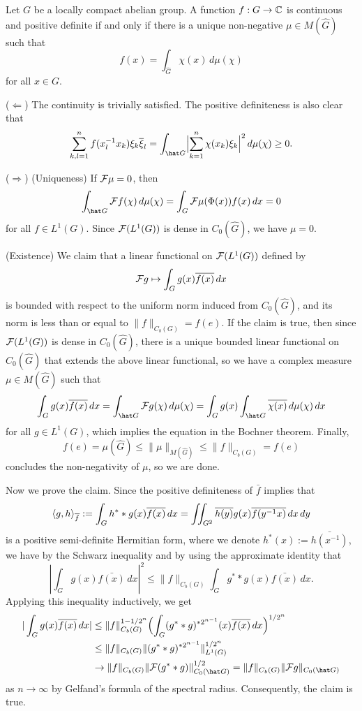 \documentclass[a4paper]{article}
\begin{document}
\begin{thm}
Let $G$ be a locally compact abelian group.
A function $f:G\to\mathbb{C}$ is continuous and positive definite if and only if there is a unique non-negative $\mu\in M(\hat G)$ such that 
\[f(x)=\int_{\hat G}\chi(x)\,d\mu(\chi)\]
for all $x\in G$.
\end{thm}
\begin{pf}
($\Leftarrow$)
The continuity is trivially satisfied.
The positive definiteness is also clear that
\[\sum_{k,l=1}^nf(x_l^{-1}x_k)\xi_k\bar\xi_l=\int_{\hat G}\Bigl|\sum_{k=1}^n\chi(x_k)\xi_k\Bigr|^2\,d\mu(\chi)\ge0.\]

($\Rightarrow$)
(Uniqueness)
If $\mathcal{F}\mu=0$, then
\[\int_{\hat G}\cF f(\chi)\,d\mu(\chi)=\int_G\cF\mu(\Phi(x))f(x)\,dx=0\]
for all $f\in L^1(G)$.
Since $\mathcal{F}(L^1(G))$ is dense in $C_0(\hat G)$, we have $\mu=0$.

(Existence)
We claim that a linear functional on $\mathcal{F}(L^1(G))$ defined by
\[\mathcal{F} g\mapsto\int_Gg(x)\overline{f(x)}\,dx\]
is bounded with respect to the uniform norm induced from $C_0(\hat G)$, and its norm is less than or equal to $\|f\|_{C_b(G)}=f(e)$.
If the claim is true, then since $\mathcal{F}(L^1(G))$ is dense in $C_0(\hat G)$, there is a unique bounded linear functional on $C_0(\hat G)$ that extends the above linear functional, so we have a complex measure $\mu\in M(\hat G)$ such that
\[\int_Gg(x)\bar{f(x)}\,dx=\int_{\hat G}\cF g(\chi)\,d\mu(\chi)=\int_G g(x)\int_{\hat G}\bar{\chi(x)}\,d\mu(\chi)\,dx\]
for all $g\in L^1(G)$, which implies the equation in the Bochner theorem.
Finally,
\[f(e)=\mu(\hat G)\le\|\mu\|_{M(\hat G)}\le\|f\|_{C_b(G)}=f(e)\] concludes the non-negativity of $\mu$, so we are done.

Now we prove the claim.
Since the positive definiteness of $\bar f$ implies that
\[\langle g,h\rangle_{\overline f}:=\int_Gh^**g(x)\overline{f(x)}\,dx=\iint_{G^2}\overline{h(y)}g(x)\overline{f(y^{-1}x)}\,dx\,dy\]
is a positive semi-definite Hermitian form, where we denote $h^*(x):=\bar{h(x^{-1})}$, we have by the Schwarz inequality and by using the approximate identity that
\[|\int_Gg(x)\bar{f(x)}\,dx|^2\le\|f\|_{C_b(G)}\int_G g^**g(x)\bar{f(x)}\,dx.\]
Applying this inequality inductively, we get
\begin{align*}
|\int_Gg(x)\bar{f(x)}\,dx|
&\le\|f\|_{C_b(G)}^{1-1/2^n}\Bigl(\int_G(g^**g)^{*2^{n-1}}(x)\bar{f(x)}\,dx\Bigr)^{1/2^n}\\
&\le\|f\|_{C_b(G)}\|(g^**g)^{*2^{n-1}}\|_{L^1(G)}^{1/2^n}\\
&\to\|f\|_{C_b(G)}\|\cF(g^**g)\|_{C_0(\hat G)}^{1/2}=\|f\|_{C_b(G)}\|\cF g\|_{C_0(\hat G)}
\end{align*}
as $n\to\infty$ by Gelfand's formula of the spectral radius.
Consequently, the claim is true.
\end{pf}
\end{document}
